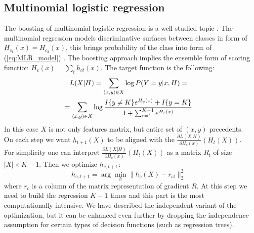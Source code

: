 \documentclass{article}
\begin{document}
\subsection{Multinomial logistic regression}
The boosting of multinomial logistic regression is a well studied topic \cite{Friedman98additivelogistic}. The multinomial regression models discriminative surfaces between classes in form of $H_{c_1}(x)=H_{c_2}(x)$, this brings probability of the class into form of (\ref{eq:MLR_model}) \cite{GLM}. The boosting approach implies the ensemble form of scoring function $H_c(x) = \sum_t h_{ct}(x)$. The target function is the following:
\begin{multline*}
	L(X\arrowvert H) = \sum_{(x,y) \in X} \log P(Y = y \arrowvert x, H) = \\
	= \sum_{(x,y) \in X} \log \frac{ I\{y \ne K \}e^{H_y(x)} + I\{y=K\} }{ 1+\sum_{c=1}^{K-1} e^{H_c(x)} }
\end{multline*}
In this case $X$ is not only features matrix, but entire set of $(x, y)$ precedents. On each step we want $h_{t + 1}(X)$ to be aligned with the $\frac{\partial L(X|H)}{\partial H_c(x)}(H_t(X))$. For simplicity one can interpret $\frac{\partial L(X|H)}{\partial H_c(x)}(H_t(X))$ as a matrix $R_t$ of size $|X|\times K-1$. Then we optimize $h_{c,t+1}$:
\begin{equation}
h_{c,t+1} = \arg \min_h \|h_c(X) - r_{ct}\|_2^2
\label{eq:MLR_boosting_step}
\end{equation}
where $r_c$ is a column of the matrix representation of gradient $R$. At this step we need to build the regression $K-1$ times and this part is the most computationally intensive. We have described the independent variant of the optimization, but it can be enhanced even further by dropping the independence assumption for certain types of decision functions (such as regression trees).
\end{document}
